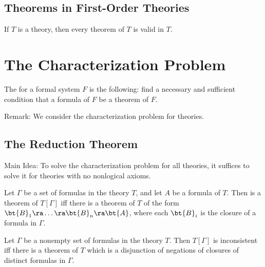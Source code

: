 
\subsection{Theorems in First-Order Theories}

\begin{theorem}
	If $T$ is a theory, then every theorem of $T$ is valid in $T$.
\end{theorem}


\newpage

\section{The Characterization Problem}

\begin{definition}
	The  for a formal system $F$ is the following: find a 
	necessary and sufficient condition that a formula of $F$ be a 
	theorem of $F$.
\end{definition}

Remark: We consider the characterization problem for theories.


\subsection{The Reduction Theorem}

Main Idea: To solve the characterization problem for all theories, 
it suffices to solve it for theories with no nonlogical axioms.

\begin{theorem}
	Let $\Gamma$ be a set of formulas in the theory $T$, and let 
	$A$ be a formula of $T$. Then  is a theorem of 
	$T[\Gamma]$ iff there is a theorem of $T$ of the form $\bt{B}_1 
	\ra \dots \ra \bt{B}_n \ra \bt{A}$, where each $\bt{B}_i$ is 
	the closure of a formula in $\Gamma$.
\end{theorem}

\begin{theorem}
	Let $\Gamma$ be a nonempty set of formulas in the theory $T$. 
	Then $T[\Gamma]$ is inconsistent iff there is a theorem of $T$ 
	which is a disjunction of negations of closures of distinct 
	formulas in $\Gamma$.
\end{theorem}

